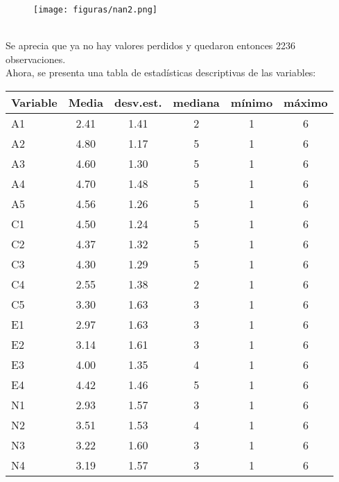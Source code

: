 \documentclass{report}
\begin{document}
\begin{figure}[htp]
        \centering
    	\texttt{[image: figuras/nan2.png]}
    	\label{fig: Figura1}
\end{figure}\\

Se aprecia que ya no hay valores perdidos y quedaron entonces 2236 observaciones.\\

Ahora, se presenta una tabla de estadísticas descriptivas de las variables:\\
\vspace{6cm}

\begin{table}[h!]
  \begin{center}
    \label{tab:table1}
    \begin{tabular}{|l|c|c|c|c|c|} 
    \hline
      \textbf{Variable} & \textbf{Media} & \textbf{desv.est.} & \textbf{mediana} & \textbf{mínimo} & \textbf{máximo}\\
      \hline
A1      &2.41 &  1.41   &   2 &  1 &  6\\
\hline
A2     &4.80 & 1.17    &  5  & 1  & 6\\
\hline
A3  &4.60 & 1.30    &  5  & 1  & 6\\
\hline
A4    &4.70 & 1.48    &  5  & 1  & 6\\
\hline
A5  &  4.56 & 1.26    &  5  & 1  & 6\\
\hline
C1  &   4.50 & 1.24    &  5  & 1  & 6\\
\hline
C2  &  4.37 & 1.32    &  5  & 1  & 6\\
\hline
C3  &  4.30 & 1.29    &  5  & 1  & 6\\
\hline
C4   &2.55 & 1.38    &  2  & 1  & 6\\
\hline
C5 &3.30 & 1.63    &  3  & 1  & 6\\
\hline
E1    &2.97 & 1.63     & 3  & 1  & 6\\
\hline
E2  &3.14 & 1.61     & 3  & 1  & 6\\
\hline
E3  &4.00 & 1.35     & 4  & 1  & 6\\
\hline
E4    &4.42 & 1.46     & 5  & 1  & 6\\
\hline
N1  &2.93 & 1.57     & 3  & 1  & 6\\
\hline
N2    &3.51 & 1.53     & 4  & 1  & 6\\
\hline
N3    &3.22 & 1.60     & 3  & 1  & 6\\
\hline
N4    &3.19 & 1.57     & 3  & 1  & 6\\
\hline

\end{tabular}
\end{center}
\end{table}
\end{document}
